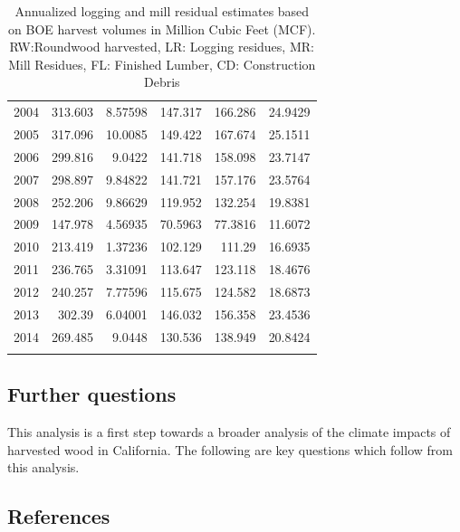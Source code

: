 \documentclass[a4paper]{article}
\begin{document}
\begin{longtable}{rrrrrr}
2004 & 313.603 & 8.57598 & 147.317 & 166.286 & 24.9429\\
2005 & 317.096 & 10.0085 & 149.422 & 167.674 & 25.1511\\
2006 & 299.816 & 9.0422 & 141.718 & 158.098 & 23.7147\\
2007 & 298.897 & 9.84822 & 141.721 & 157.176 & 23.5764\\
2008 & 252.206 & 9.86629 & 119.952 & 132.254 & 19.8381\\
2009 & 147.978 & 4.56935 & 70.5963 & 77.3816 & 11.6072\\
2010 & 213.419 & 1.37236 & 102.129 & 111.29 & 16.6935\\
2011 & 236.765 & 3.31091 & 113.647 & 123.118 & 18.4676\\
2012 & 240.257 & 7.77596 & 115.675 & 124.582 & 18.6873\\
2013 & 302.39 & 6.04001 & 146.032 & 156.358 & 23.4536\\
2014 & 269.485 & 9.0448 & 130.536 & 138.949 & 20.8424\\
\caption{Annualized logging and mill residual estimates based on BOE harvest volumes in Million Cubic Feet (MCF). RW:Roundwood harvested, LR: Logging residues, MR: Mill Residues, FL: Finished Lumber, CD: Construction Debris}
\\
\end{longtable}




\subsection{Further questions}
\label{sec:orgheadline13}

This analysis is a first step towards a broader analysis of the
climate impacts of harvested wood in California. The following are key
questions which follow from this analysis.
\subsection{References}
\label{sec:orgheadline14}


\end{document}
